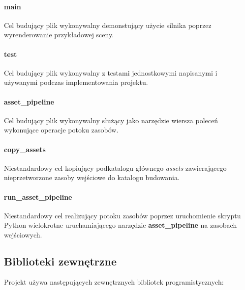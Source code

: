 \paragraph{main} Cel budujący plik wykonywalny demonstujący użycie silnika poprzez wyrenderowanie przykładowej sceny.

\paragraph{test} Cel budujący plik wykonywalny z testami jednostkowymi napisanymi i używanymi podczas implementowania projektu.

\paragraph{asset\_pipeline} Cel budujący plik wykonywalny służący jako narzędzie wiersza poleceń wykonujące operacje potoku zasobów.

\paragraph{copy\_assets} Niestandardowy cel kopiujący podkatalogu głównego \textit{assets} zawierającego nieprzetworzone zasoby wejściowe do katalogu budowania.

\paragraph{run\_asset\_pipeline} Niestandardowy cel realizujący potoku zasobów poprzez uruchomienie skryptu Python wielokrotne uruchamiającego narzędzie \textbf{asset\_pipeline} na zasobach wejściowych.


\subsection{Biblioteki zewnętrzne}

Projekt używa następujących zewnętrznych bibliotek programistycznych:

